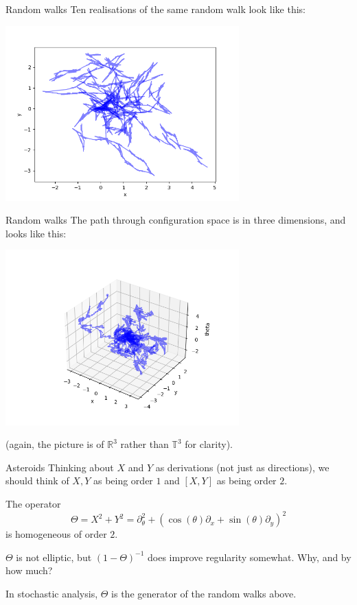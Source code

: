 \documentclass{beamer}
\numberwithin{equation}{section}
\theoremstyle{plain}
\theoremstyle{plain}
\theoremstyle{definition}
\theoremstyle{plain}
\theoremstyle{plain}
\theoremstyle{definition}
\newcommand{\Rl}{\mathbb{R}}
\newcommand{\Circ}{\mathbb{T}}
\begin{document}
\begin{frame}{Random walks}
  Ten realisations of the same random walk look like this:
  \begin{center}
    \includegraphics[width=90mm]{xy_coords_multiple_paths.png}
  \end{center}
\end{frame}

\begin{frame}{Random walks}
  The path through configuration space is in three dimensions, and looks like this:
  \begin{center}
  \includegraphics[width=90mm]{xyt_coords_multiple_paths.png}
  \end{center}
  (again, the picture is of $\Rl^3$ rather than $\Circ^3$ for clarity).
\end{frame}

\begin{frame}{Asteroids}
  Thinking about $X$ and $Y$ as derivations (not just as directions), we should think of $X,Y$ as being order $1$ and $[X,Y]$ as being order $2.$

  The operator
  \[
    \Theta = X^2+Y^2 = \partial_\theta^2+(\cos(\theta)\partial_x+\sin(\theta)\partial_y)^2
  \]
  is homogeneous of order $2.$
  \pause
  \begin{center}
      $\Theta$ is not elliptic, but $(1-\Theta)^{-1}$ does improve regularity somewhat. Why, and by how much?
  \end{center}
  \pause
  In stochastic analysis, $\Theta$ is the generator of the random walks above.
\end{frame}
\end{document}
